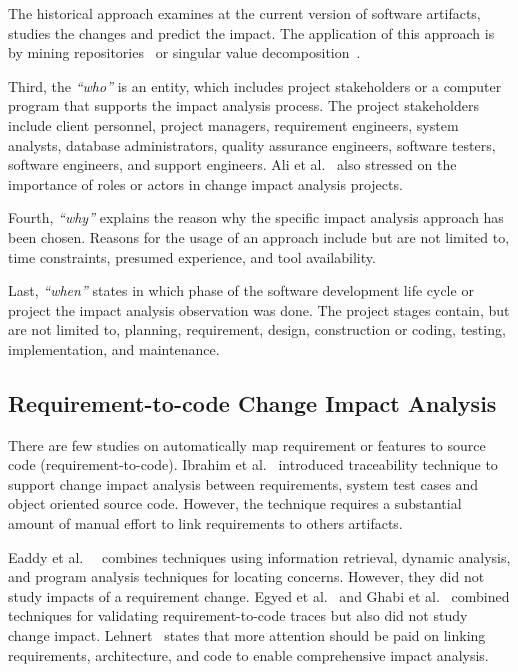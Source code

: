 \documentclass[conference]{IEEEtran}
\begin{document}
The historical approach examines at the current version of software
artifacts, studies the changes and predict the impact. The application
of this approach is by mining repositories~\cite{zimmermann2005mining,
  ying2004predicting} or singular value
decomposition~\cite{sherriff2008empirical}.

Third, the \textit{``who''} is an entity, which includes project
stakeholders or a computer program that supports the impact analysis
process. The project stakeholders include client personnel, project
managers, requirement engineers, system analysts, database
administrators, quality assurance engineers, software testers,
software engineers, and support engineers. Ali et
al.~\cite{ali2013assessing} also stressed on the importance of roles
or actors in change impact analysis projects.

Fourth, \textit{``why''} explains the reason why the specific impact
analysis approach has been chosen. Reasons for the usage of an
approach include but are not limited to, time constraints, presumed
experience, and tool availability.

Last, \textit{``when''} states in which phase of the software
development life cycle or project the impact analysis observation was
done. The project stages contain, but are not limited to, planning,
requirement, design, construction or coding, testing, implementation,
and maintenance.

\subsection{Requirement-to-code Change Impact Analysis}


There are few studies on automatically map requirement or features to
source code (requirement-to-code). Ibrahim et
al.~\cite{ibrahim2005requirements} introduced traceability technique
to support change impact analysis between requirements, system test
cases and object oriented source code. However, the technique requires
a substantial amount of manual effort 
to link requirements to others artifacts. 

Eaddy et al.~~\cite{eaddy2008cerberus} combines techniques using
information retrieval, dynamic analysis, and program analysis
techniques for locating concerns. However, they did not study impacts
of a requirement change. Egyed et al.~\cite{egyed2010effort} and Ghabi
et al.~\cite{ghabi2012code} combined techniques for validating
requirement-to-code traces but also did not study change
impact. Lehnert~\cite{lehnert2011taxonomy} states that more attention
should be paid on linking requirements, architecture, and code to
enable comprehensive impact analysis.
\end{document}
